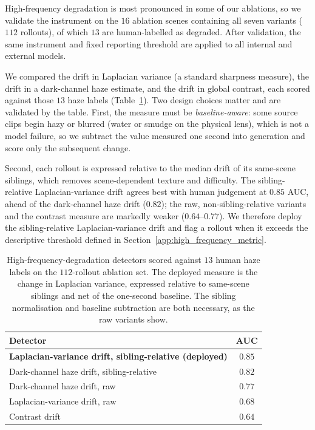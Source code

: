 High-frequency degradation is most pronounced in some of our ablations, so we
validate the instrument on the $16$ ablation scenes containing all seven
variants ($112$ rollouts), of which $13$ are human-labelled as degraded. After
validation, the same instrument and fixed reporting threshold are applied to
all internal and external models.

We compared the drift in Laplacian variance (a standard sharpness measure), the
drift in a dark-channel haze estimate, and the drift in global contrast, each
scored against those $13$ haze labels (Table~\ref{tab:val_hf}). Two design
choices matter and are validated by the table. First, the measure must be
\emph{baseline-aware}: some source clips begin hazy or blurred (water or smudge
on the physical lens), which is not a model failure, so we subtract the value
measured one second into generation and score only the subsequent change.

Second, each rollout is expressed relative to the median drift of its same-scene
siblings, which removes scene-dependent texture and difficulty. The
sibling-relative Laplacian-variance drift agrees best with human judgement at
$0.85$ AUC, ahead of the dark-channel haze drift ($0.82$); the raw,
non-sibling-relative variants and the contrast measure are markedly weaker
($0.64$--$0.77$). We therefore deploy the sibling-relative Laplacian-variance
drift and flag a rollout when it exceeds the descriptive threshold defined in Section~\ref{app:high_frequency_metric}. 

\begin{table}[t]
\centering
{
\small
\begin{tabular}{lc}
\toprule
Detector & AUC \\
\midrule
\textbf{Laplacian-variance drift, sibling-relative (deployed)}
    & $\mathbf{0.85}$ \\
Dark-channel haze drift, sibling-relative
    & $0.82$ \\
Dark-channel haze drift, raw
    & $0.77$ \\
Laplacian-variance drift, raw
    & $0.68$ \\
Contrast drift
    & $0.64$ \\
\bottomrule
\end{tabular}
}
\caption{
    High-frequency-degradation detectors scored against $13$ human haze labels
    on the $112$-rollout ablation set. The deployed measure is the change in
    Laplacian variance, expressed relative to same-scene siblings and net of the
    one-second baseline. The sibling normalisation and baseline subtraction are
    both necessary, as the raw variants show.
}
\label{tab:val_hf}
\end{table}

